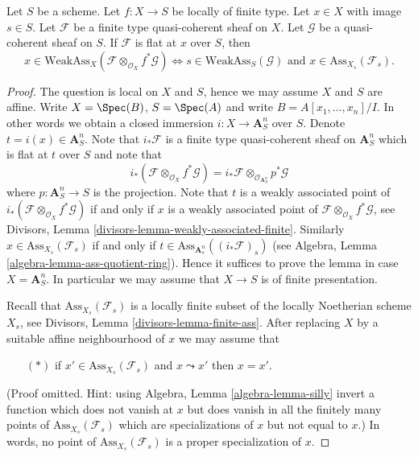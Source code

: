\begin{lemma}
\label{lemma-bourbaki-finite-type-general-base-at-point}
Let $S$ be a scheme.
Let $f : X \to S$ be locally of finite type.
Let $x \in X$ with image $s \in S$.
Let $\mathcal{F}$ be a finite type quasi-coherent sheaf on $X$.
Let $\mathcal{G}$ be a quasi-coherent sheaf on $S$.
If $\mathcal{F}$ is flat at $x$ over $S$, then
$$
x \in \text{WeakAss}_X(\mathcal{F} \otimes_{\mathcal{O}_X} f^*\mathcal{G})
\Leftrightarrow
s \in \text{WeakAss}_S(\mathcal{G})
\text{ and }
x \in \text{Ass}_{X_s}(\mathcal{F}_s).
$$
\end{lemma}

\begin{proof}
The question is local on $X$ and $S$, hence we may assume $X$ and $S$
are affine. Write $X = \Spec(B)$, $S = \Spec(A)$ and write
$B = A[x_1, \ldots, x_n]/I$. In other words we obtain a closed immersion
$i : X \to \mathbf{A}^n_S$ over $S$. Denote $t = i(x) \in \mathbf{A}^n_S$.
Note that $i_*\mathcal{F}$ is a finite type quasi-coherent sheaf on
$\mathbf{A}^n_S$ which is flat at $t$ over $S$ and note that
$$
i_*(\mathcal{F} \otimes_{\mathcal{O}_X} f^*\mathcal{G}) =
i_*\mathcal{F} \otimes_{\mathcal{O}_{\mathbf{A}^n_S}} p^*\mathcal{G}
$$
where $p : \mathbf{A}^n_S \to S$ is the projection. Note that
$t$ is a weakly associated point of
$i_*(\mathcal{F} \otimes_{\mathcal{O}_X} f^*\mathcal{G})$
if and only if $x$ is a weakly associated point of
$\mathcal{F} \otimes_{\mathcal{O}_X} f^*\mathcal{G}$, see
Divisors, Lemma \ref{divisors-lemma-weakly-associated-finite}.
Similarly $x \in \text{Ass}_{X_s}(\mathcal{F}_s)$ if and only
if $t \in \text{Ass}_{\mathbf{A}^n_s}((i_*\mathcal{F})_s)$ (see
Algebra, Lemma \ref{algebra-lemma-ass-quotient-ring}).
Hence it suffices to prove the lemma in case $X = \mathbf{A}^n_S$.
In particular we may assume that $X \to S$ is of finite presentation.

\medskip\noindent
Recall that $\text{Ass}_{X_s}(\mathcal{F}_s)$ is a locally finite subset
of the locally Noetherian scheme $X_s$, see
Divisors, Lemma \ref{divisors-lemma-finite-ass}.
After replacing $X$ by a suitable affine neighbourhood of $x$ we may
assume that
\begin{itemize}
\item[$(*)$] if $x' \in \text{Ass}_{X_s}(\mathcal{F}_s)$ and $x \leadsto x'$
then $x = x'$.
\end{itemize}
(Proof omitted. Hint: using
Algebra, Lemma \ref{algebra-lemma-silly}
invert a function which does not vanish at $x$ but does vanish
in all the finitely many points of $\text{Ass}_{X_s}(\mathcal{F}_s)$
which are specializations of $x$ but not equal to $x$.)
In words, no point of $\text{Ass}_{X_s}(\mathcal{F}_s)$
is a proper specialization of $x$.


\end{proof}

